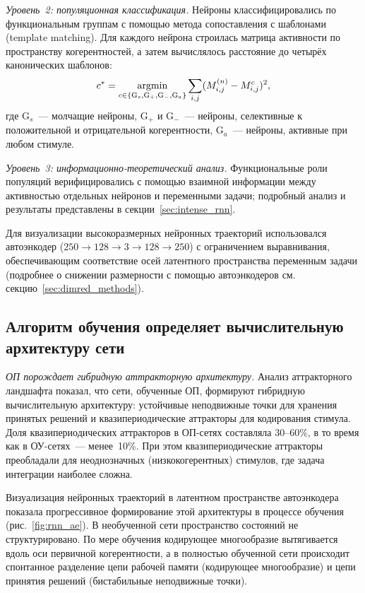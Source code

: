 \textit{Уровень~2: популяционная классификация.} Нейроны классифицировались по функциональным группам с помощью метода сопоставления с шаблонами (template matching). Для каждого нейрона строилась матрица активности по пространству когерентностей, а затем вычислялось расстояние до четырёх канонических шаблонов:
\begin{equation}
c^* = \operatorname*{argmin}_{c \in \{\mathrm{G}_s,\mathrm{G}_+,\mathrm{G}_-,\mathrm{G}_a\}} \sum_{i,j} (M^{(n)}_{i,j}-M^{c}_{i,j})^2,
\label{eq:rnn_population}
\end{equation}
где $\mathrm{G}_s$~--- молчащие нейроны, $\mathrm{G}_+$ и $\mathrm{G}_-$~--- нейроны, селективные к положительной и отрицательной когерентности, $\mathrm{G}_a$~--- нейроны, активные при любом стимуле.

\textit{Уровень~3: информационно-теоретический анализ.} Функциональные роли популяций верифицировались с помощью взаимной информации между активностью отдельных нейронов и переменными задачи; подробный анализ и результаты представлены в секции~\ref{sec:intense_rnn}.

Для визуализации высокоразмерных нейронных траекторий использовался автоэнкодер ($250 \to 128 \to 3 \to 128 \to 250$) с ограничением выравнивания, обеспечивающим соответствие осей латентного пространства переменным задачи (подробнее о снижении размерности с помощью автоэнкодеров см. секцию~\ref{sec:dimred_methods}).


\subsection{Алгоритм обучения определяет вычислительную архитектуру сети}\label{sec:rnn_results}

\textit{ОП порождает гибридную аттракторную архитектуру.} Анализ аттракторного ландшафта показал, что сети, обученные ОП, формируют гибридную вычислительную архитектуру: устойчивые неподвижные точки для хранения принятых решений и квазипериодические аттракторы для кодирования стимула. Доля квазипериодических аттракторов в ОП-сетях составляла 30--60\%, в то время как в ОУ-сетях~--- менее~10\%. При этом квазипериодические аттракторы преобладали для неоднозначных (низкокогерентных) стимулов, где задача интеграции наиболее сложна.

Визуализация нейронных траекторий в латентном пространстве автоэнкодера показала прогрессивное формирование этой архитектуры в процессе обучения (рис.~\ref{fig:rnn_ae}). В необученной сети пространство состояний не структурировано. По мере обучения кодирующее многообразие вытягивается вдоль оси первичной когерентности, а в полностью обученной сети происходит спонтанное разделение цепи рабочей памяти (кодирующее многообразие) и цепи принятия решений (бистабильные неподвижные точки).

